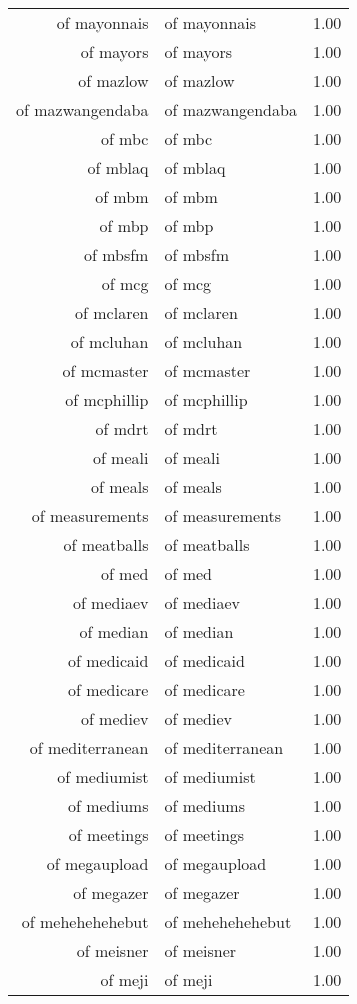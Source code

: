 \begin{table}[ht]
\begin{tabular}{rlr}
  of mayonnais & of mayonnais & 1.00 \\ 
  of mayors & of mayors & 1.00 \\ 
  of mazlow & of mazlow & 1.00 \\ 
  of mazwangendaba & of mazwangendaba & 1.00 \\ 
  of mbc & of mbc & 1.00 \\ 
  of mblaq & of mblaq & 1.00 \\ 
  of mbm & of mbm & 1.00 \\ 
  of mbp & of mbp & 1.00 \\ 
  of mbsfm & of mbsfm & 1.00 \\ 
  of mcg & of mcg & 1.00 \\ 
  of mclaren & of mclaren & 1.00 \\ 
  of mcluhan & of mcluhan & 1.00 \\ 
  of mcmaster & of mcmaster & 1.00 \\ 
  of mcphillip & of mcphillip & 1.00 \\ 
  of mdrt & of mdrt & 1.00 \\ 
  of meali & of meali & 1.00 \\ 
  of meals & of meals & 1.00 \\ 
  of measurements & of measurements & 1.00 \\ 
  of meatballs & of meatballs & 1.00 \\ 
  of med & of med & 1.00 \\ 
  of mediaev & of mediaev & 1.00 \\ 
  of median & of median & 1.00 \\ 
  of medicaid & of medicaid & 1.00 \\ 
  of medicare & of medicare & 1.00 \\ 
  of mediev & of mediev & 1.00 \\ 
  of mediterranean & of mediterranean & 1.00 \\ 
  of mediumist & of mediumist & 1.00 \\ 
  of mediums & of mediums & 1.00 \\ 
  of meetings & of meetings & 1.00 \\ 
  of megaupload & of megaupload & 1.00 \\ 
  of megazer & of megazer & 1.00 \\ 
  of mehehehehebut & of mehehehehebut & 1.00 \\ 
  of meisner & of meisner & 1.00 \\ 
  of meji & of meji & 1.00 \\ 

\end{tabular}
\end{table}

